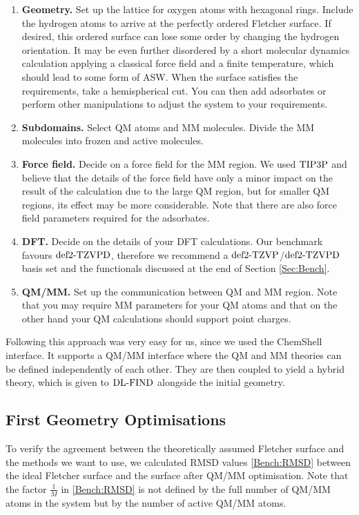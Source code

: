 \documentclass[8.5pt,twoside,twocolumn]{article}
\newcommand\dlfind{\enmat{\te{DL-FIND}}}
\theoremstyle{standard}
\begin{document}
\begin{enumerate}
  \item \textbf{Geometry.} Set up the lattice for oxygen atoms with hexagonal
  rings. Include the hydrogen atoms to arrive at the perfectly ordered Fletcher
  surface. If desired, this ordered surface can lose some order by changing the
  hydrogen orientation. It may be even further disordered by a short molecular
  dynamics calculation applying a classical force field and a finite
  temperature, which should lead to some form of ASW. When the surface satisfies the
  requirements, take a hemispherical cut. You can then add adsorbates or 
  perform other manipulations to adjust the system to your requirements.
  \item \textbf{Subdomains.} Select QM atoms and MM molecules. Divide
  the MM molecules into frozen and active molecules.
  \item \textbf{Force field.} Decide on a force field for the MM region.
  We used $\text{TIP3P}$ and believe that the details of the force field have only
  a minor impact on the result of the calculation due to the large
  QM region, but for smaller QM regions, its effect may be more considerable.
  Note that there are also force field parameters required for the adsorbates.
  \item \textbf{DFT.} Decide on the details of your DFT calculations. Our
  benchmark favours $\text{def2-TZVPD}$, therefore we recommend a $\text{def2-TZVP}$/$\text{def2-TZVPD}$ basis
  set and the functionals discussed at the end of Section \ref{Sec:Bench}.
  \item \textbf{QM/MM.} Set up the communication between QM and MM region. Note
  that you may require MM parameters for your QM atoms and that on the other
  hand your QM calculations should support point charges.
\end{enumerate}
Following this approach was very easy for us, since we used the
ChemShell interface. It supports a QM/MM interface where the QM and MM
theories can be defined independently of each other. They are then coupled to
yield a hybrid theory, which is given to $\dlfind$ alongside the initial geometry.

\subsection{First Geometry Optimisations}
\label{Sec:Ads:Optima}

To verify the agreement between the theoretically assumed Fletcher surface and the
methods we want to use, we calculated RMSD values \eqref{Bench:RMSD} between
the ideal Fletcher surface and the surface after QM/MM optimisation.
Note that the factor $\frac 1 M$ in \eqref{Bench:RMSD} is not defined by the
full number of QM/MM atoms in the system but by the number of active QM/MM atoms.
\end{document}
